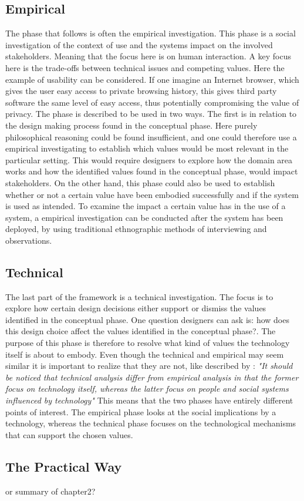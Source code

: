 \subsection{Empirical}
The phase that follows is often the empirical investigation. This phase is a social investigation of the context of use and the systems impact on the involved stakeholders. Meaning that the focus here is on human interaction. A key focus here is the trade-offs between technical issues and competing values. Here the example of usability can be considered. If one imagine an Internet browser, which gives the user easy access to private browsing history, this gives third party software the same level of easy access, thus potentially compromising the value of privacy.\newline
The phase is described to be used in two ways. The first is in relation to the design making process found in the conceptual phase. Here purely philosophical reasoning could be found insufficient, and one could therefore use a empirical investigating to establish which values would be most relevant in the particular setting. This would require designers to explore how the domain area works and how the identified values found in the conceptual phase, would impact stakeholders. \newline
On the other hand, this phase could also be used to establish whether or not a certain value have been embodied successfully and if the system is used as intended. To examine the impact a certain value has in the use of a system, a empirical investigation can be conducted after the system has been deployed, by using traditional ethnographic methods of interviewing and observations.

\subsection{Technical}
The last  part of the framework is a technical investigation. The focus is to explore how certain design decisions either support or dismiss the values identified in the conceptual phase. One question designers can ask is: how does this design choice affect the values identified in the conceptual phase?. The purpose of this phase is therefore to resolve what kind of values the technology itself is about to embody. Even though the technical and empirical may seem similar it is important to realize that they are not, like described by \citet[p. 67]{EthicsAndTechnologyDesign}: \textit{"It should be noticed that technical analysis differ from empirical analysis in that the former focus on technology itself, whereas the latter focus on people and social systems influenced by technology"}\newline
This means that the two phases have entirely different points of interest. The empirical phase looks at the social implications by a technology, whereas the technical phase focuses on the technological mechanisms that can support the chosen values. 

\subsection{The Practical Way}

 or summary of chapter2?
